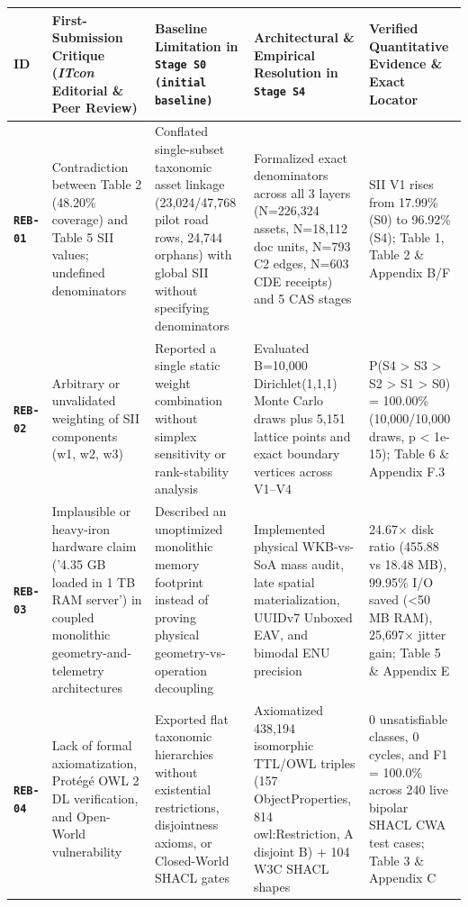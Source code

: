 \documentclass[10pt,a4paper]{article}
\begin{document}
{\scriptsize
\begin{longtable}{p{}p{}p{}p{}p{}}
\toprule
\textbf{ID} & \textbf{First-Submission Critique (\textit{ITcon} Editorial \& Peer Review)} & \textbf{Baseline Limitation in \texttt{Stage S0 (initial baseline)}} & \textbf{Architectural \& Empirical Resolution in \texttt{Stage S4}} & \textbf{Verified Quantitative Evidence \& Exact Locator} \\
\midrule
\endhead
\textbf{\texttt{REB-01}} & Contradiction between Table 2 (48.20\% coverage) and Table 5 SII values; undefined denominators & Conflated single-subset taxonomic asset linkage (23,024/47,768 pilot road rows, 24,744 orphans) with global SII without specifying denominators & Formalized exact denominators across all 3 layers (N=226,324 assets, N=18,112 doc units, N=793 C2 edges, N=603 CDE receipts) and 5 CAS stages & SII V1 rises from 17.99\% (S0) to 96.92\% (S4); Table 1, Table 2 \& Appendix B/F \\
\textbf{\texttt{REB-02}} & Arbitrary or unvalidated weighting of SII components (w1, w2, w3) & Reported a single static weight combination without simplex sensitivity or rank-stability analysis & Evaluated B=10,000 Dirichlet(1,1,1) Monte Carlo draws plus 5,151 lattice points and exact boundary vertices across V1--V4 & P(S4 > S3 > S2 > S1 > S0) = 100.00\% (10,000/10,000 draws, p < 1e-15); Table 6 \& Appendix F.3 \\
\textbf{\texttt{REB-03}} & Implausible or heavy-iron hardware claim ('4.35 GB loaded in 1 TB RAM server') in coupled monolithic geometry-and-telemetry architectures & Described an unoptimized monolithic memory footprint instead of proving physical geometry-vs-operation decoupling & Implemented physical WKB-vs-SoA mass audit, late spatial materialization, UUIDv7 Unboxed EAV, and bimodal ENU precision & 24.67$\times$ disk ratio (455.88 vs 18.48 MB), 99.95\% I/O saved (<50 MB RAM), 25,697$\times$ jitter gain; Table 5 \& Appendix E \\
\textbf{\texttt{REB-04}} & Lack of formal axiomatization, Protégé OWL 2 DL verification, and Open-World vulnerability & Exported flat taxonomic hierarchies without existential restrictions, disjointness axioms, or Closed-World SHACL gates & Axiomatized 438,194 isomorphic TTL/OWL triples (157 ObjectProperties, 814 owl:Restriction, A disjoint B) + 104 W3C SHACL shapes & 0 unsatisfiable classes, 0 cycles, and F1 = 100.0\% across 240 live bipolar SHACL CWA test cases; Table 3 \& Appendix C \\

\end{longtable}}
\end{document}
